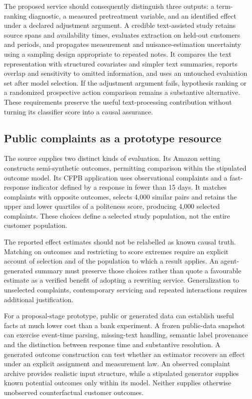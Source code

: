 The proposed service should consequently distinguish three outputs: a
term-ranking diagnostic, a measured pretreatment variable, and an identified
effect under a declared adjustment argument. A credible text-assisted study
retains source spans and availability times, evaluates extraction on held-out
customers and periods, and propagates measurement and nuisance-estimation
uncertainty using a sampling design appropriate to repeated notes. It compares
the text representation with structured covariates and simpler text summaries,
reports overlap and sensitivity to omitted information, and uses an untouched
evaluation set after model selection. If the adjustment argument fails,
hypothesis ranking or a randomized prospective action comparison remains a
substantive alternative. These requirements preserve the useful text-processing
contribution without turning its classifier score into a causal assurance.

\subsection{Public complaints as a prototype resource}

The source supplies two distinct kinds of evaluation. Its Amazon setting constructs semi-synthetic outcomes, permitting comparison within the stipulated outcome model. Its CFPB application uses observational complaints and a fast-response indicator defined by a response in fewer than 15 days. It matches complaints with opposite outcomes, selects 4,000 similar pairs and retains the upper and lower quartiles of a politeness score, producing 4,000 selected complaints. These choices define a selected study population, not the entire customer population.~\citep{exec28_lm_pryzant}

The reported effect estimates should not be relabelled as known causal truth. Matching on outcomes and restricting to score extremes require an explicit account of selection and of the population to which a result applies. An agent-generated summary must preserve those choices rather than quote a favourable estimate as a verified benefit of adopting a rewriting service. Generalization to unselected complaints, contemporary servicing and repeated interactions requires additional justification.

For a proposal-stage prototype, public or generated data can establish useful facts at much lower cost than a bank experiment. A frozen public-data snapshot can exercise event-time parsing, missing-text handling, semantic label provenance and the distinction between response time and substantive resolution. A generated outcome construction can test whether an estimator recovers an effect under an explicit assignment and measurement law. An observed complaint archive provides realistic input structure, while a stipulated generator supplies known potential outcomes only within its model. Neither supplies otherwise unobserved counterfactual customer outcomes.

